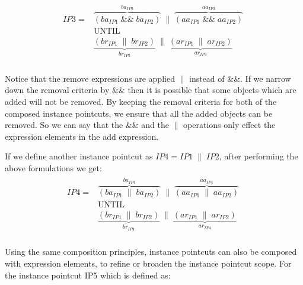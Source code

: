 \documentclass{llncs}
\begin{document}
\begin{align}
\begin{split}
IP3 =& \overbrace{\left( ba_{IP1}\;\textrm{\&\&}\;ba_{IP2}\right)}^{ba_{IP3}}\;\|\;\overbrace{\left( aa_{IP1}\;\textrm{\&\&}\;aa_{IP2} \right)}^{aa_{IP3}}\;\\
&\textrm{UNTIL} \\
&\underbrace{\left( br_{IP1}\;\|\;br_{IP2}\right)}_{br_{IP3}}\;\|\;\underbrace{\left( ar_{IP1}\;\|\;ar_{IP2} \right)}_{ar_{IP3}}\;\\  
\label{ip3step}
\end{split}
\end{align}

Notice that the remove expressions are applied $\|$ instead of \&\&. If we narrow down the removal criteria by \&\& then it is possible that some objects which are added will not be removed. By keeping the removal criteria for both of the composed instance pointcuts, we ensure that all the added objects can be removed. So we can say that the \&\& and the $\|$ operations only effect the expression elements in the add expression.


If we define another instance pointcut as $ IP4 = IP1\;\|\;IP2$, after performing the above formulations we get:
\begin{align}
\begin{split}
IP4 =& \overbrace{\left( ba_{IP1}\;\|\;ba_{IP2}\right)}^{ba_{IP4}}\;\|\;\overbrace{\left( aa_{IP1}\;\|\;aa_{IP2} \right)}^{aa_{IP4}}\;\\
&\textrm{UNTIL} \\
&\underbrace{\left( br_{IP1}\;\|\;br_{IP2}\right)}_{br_{IP4}}\;\|\;\underbrace{\left( ar_{IP1}\;\|\;ar_{IP2} \right)}_{ar_{IP4}}\;\\  
\label{ip3step}
\end{split}
\end{align}


Using the same composition principles, instance pointcuts can also be composed with expression elements, to refine or broaden the instance pointcut scope. For the instance pointcut IP5 which is defined as:
\end{document}
